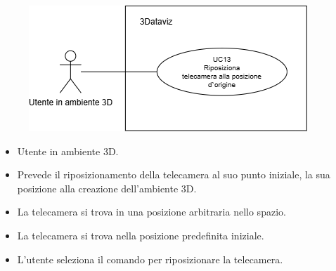 \begin{figure}[h!]\centering
    \includegraphics[scale=0.7]{template/images/UC13.png}
    \caption{}
\end{figure}
\UCdsc
{ %
    \begin{itemize}
        \item Utente in ambiente 3D.
    \end{itemize}
}
{ %
    \begin{itemize}
        \item Prevede il riposizionamento della telecamera al suo punto iniziale, la sua posizione alla creazione dell'ambiente 3D.
    \end{itemize}
}
{ %
    \begin{itemize}
        \item La telecamera si trova in una posizione arbitraria nello spazio.
    \end{itemize}
}
{ %
    \begin{itemize}
        \item La telecamera si trova nella posizione predefinita iniziale.
    \end{itemize}
}
{ %
    \begin{itemize}
        \item L'utente seleziona il comando per riposizionare la telecamera.
    \end{itemize}
} 



